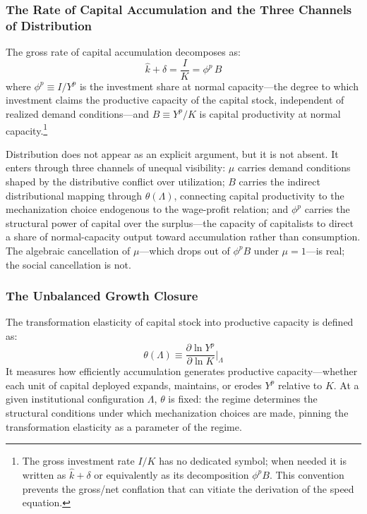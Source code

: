 \documentclass[11pt,a4paper]{article}
\begin{document}
\subsubsection{The Rate of Capital Accumulation and the Three Channels of Distribution}
\label{sec:rate_of_accumulation}

The gross rate of capital accumulation decomposes as:
%
\begin{equation}\label{eq:gross_rate}
	\hat{k} + \delta = \frac{I}{K} = \phi^p \, B
\end{equation}
%
where $\phi^p \equiv I/Y^p$ is the investment share at normal capacity---the degree to which investment claims the productive capacity of the capital stock, independent of realized demand conditions---and $B \equiv Y^p/K$ is capital productivity at normal capacity.\footnote{The gross investment rate $I/K$ has no dedicated symbol; when needed it is written as $\hat{k} + \delta$ or equivalently as its decomposition $\phi^p B$. This convention prevents the gross/net conflation that can vitiate the derivation of the speed equation.}

Distribution does not appear as an explicit argument, but it is not absent. It enters through three channels of unequal visibility: $\mu$ carries demand conditions shaped by the distributive conflict over utilization; $B$ carries the indirect distributional mapping through $\theta(\Lambda)$, connecting capital productivity to the mechanization choice endogenous to the wage-profit relation; and $\phi^p$ carries the structural power of capital over the surplus---the capacity of capitalists to direct a share of normal-capacity output toward accumulation rather than consumption. The algebraic cancellation of $\mu$---which drops out of $\phi^p B$ under $\mu = 1$---is real; the social cancellation is not.


\subsubsection{The Unbalanced Growth Closure}
\label{sec:unbalanced_growth_closure}

The transformation elasticity of capital stock into productive capacity is defined as:
%
\begin{equation}\label{eq:theta_def}
	\theta(\Lambda) \equiv \frac{\partial \ln Y^p}{\partial \ln K}\bigg|_\Lambda
\end{equation}
%
It measures how efficiently accumulation generates productive capacity---whether each unit of capital deployed expands, maintains, or erodes $Y^p$ relative to $K$. At a given institutional configuration $\Lambda$, $\theta$ is fixed: the regime determines the structural conditions under which mechanization choices are made, pinning the transformation elasticity as a parameter of the regime.
\end{document}
